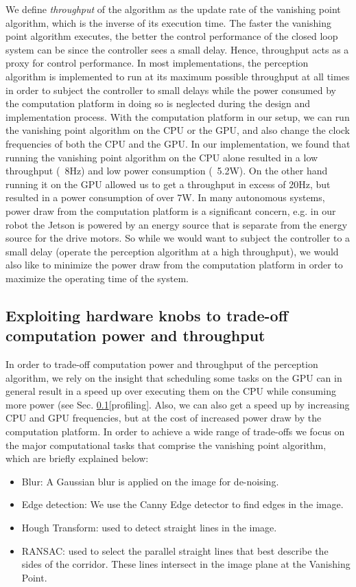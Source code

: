 We define \textit{throughput} of the algorithm as the update rate of the vanishing point algorithm, which is the inverse of its execution time. The faster the vanishing point algorithm executes, the better the control performance of the closed loop system can be since the controller sees a small delay. Hence, throughput acts as a proxy for control performance. In most implementations, the perception algorithm is implemented to run at its maximum possible throughput at all times in order to subject the controller to small delays while the power consumed by the computation platform in doing so is neglected during the design and implementation process. With the computation platform in our setup, we can run the vanishing point algorithm on the CPU or the GPU, and also change the clock frequencies of both the CPU and the GPU. In our implementation, we found that running the vanishing point algorithm on the CPU alone resulted in a low throughput (~8Hz) and low power consumption (~5.2W). On the other hand running it on the GPU allowed us to get a throughput in excess of 20Hz, but resulted in a power consumption of over 7W. In many autonomous systems, power draw from the computation platform is a significant concern, e.g. in our robot the Jetson is powered by an energy source that is separate from the energy source for the drive motors. So while we would want to subject the controller to a small delay (operate the perception algorithm at a high throughput), we would also like to minimize the power draw from the computation platform in order to maximize the operating time of the system. 


\subsection{Exploiting hardware knobs to trade-off computation power and throughput}

In order to trade-off computation power and throughput of the perception algorithm, we rely on the insight that scheduling some tasks on the GPU can in general result in a speed up over executing them on the CPU while consuming more power (see Sec. \ref{}[profiling]. Also, we can also get a speed up by increasing CPU and GPU frequencies, but at the cost of increased power draw by the computation platform. In order to achieve a wide range of trade-offs we focus on the major computational tasks that comprise the vanishing point algorithm, which are briefly explained below:

\begin{itemize}
\item Blur: A Gaussian blur is applied on the image for de-noising.
\item Edge detection: We use the Canny Edge detector to find edges in the image.
\item Hough Transform: used to detect straight lines in the image.
\item RANSAC: used to select the parallel straight lines that best describe the sides of the corridor. These lines intersect in the image plane at the Vanishing Point.
\end{itemize}

